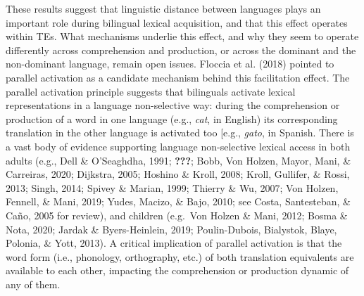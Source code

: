 \documentclass[
  english,
  man,man,floatsintext]{apa6}
\begin{document}
These results suggest that linguistic distance between languages plays an important role during bilingual lexical acquisition, and that this effect operates within TEs. What mechanisms underlie this effect, and why they seem to operate differently across comprehension and production, or across the dominant and the non-dominant language, remain open issues. Floccia et al. (2018) pointed to parallel activation as a candidate mechanism behind this facilitation effect. The parallel activation principle suggests that bilinguals activate lexical representations in a language non-selective way: during the comprehension or production of a word in one language (e.g., \emph{cat}, in English) its corresponding translation in the other language is activated too {[}e.g., \emph{gato}, in Spanish. There is a vast body of evidence supporting language non-selective lexical access in both adults (e.g., Dell \& O'Seaghdha, 1991; {\textbf{???}}; Bobb, Von Holzen, Mayor, Mani, \& Carreiras, 2020; Dijkstra, 2005; Hoshino \& Kroll, 2008; Kroll, Gullifer, \& Rossi, 2013; Singh, 2014; Spivey \& Marian, 1999; Thierry \& Wu, 2007; Von Holzen, Fennell, \& Mani, 2019; Yudes, Macizo, \& Bajo, 2010; see Costa, Santesteban, \& Caño, 2005 for review), and children (e.g.~Von Holzen \& Mani, 2012; Bosma \& Nota, 2020; Jardak \& Byers-Heinlein, 2019; Poulin-Dubois, Bialystok, Blaye, Polonia, \& Yott, 2013). A critical implication of parallel activation is that the word form (i.e., phonology, orthography, etc.) of both translation equivalents are available to each other, impacting the comprehension or production dynamic of any of them.
\end{document}
